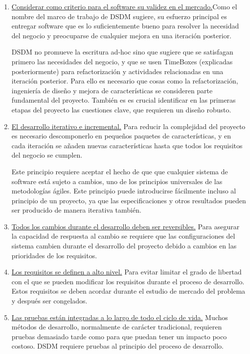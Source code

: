 \documentclass[12pt,a4paper]{article}
\begin{document}
\begin{enumerate}
\item \underline{Considerar como criterio para el software su validez en el mercado.}Como el nombre del marco de trabajo de DSDM sugiere, su esfuerzo principal es entregar
software que es lo suficientemente bueno para resolver la necesidad del negocio y preocuparse de cualquier mejora en una iteración posterior.


 DSDM no promueve la escritura ad-hoc sino que sugiere que se satisfagan  primero las necesidades del negocio, y que se usen TimeBoxes (explicadas posteriormente) para
refactorización y actividades relacionadas en una iteración posterior. Para ello es necesario que cosas como  la refactorización, ingeniería de diseño y mejora de características se consideren parte fundamental del proyecto. También es es crucial identificar en las primeras etapas del proyecto las cuestiones clave, que requieren un diseño robusto.




\item \underline{El desarrollo iterativo e incremental.}
Para reducir la complejidad del proyecto es necesario descomponerlo en pequeños paquetes de  características, y en cada iteración se añaden nuevas características hasta que todos los requisitos del negocio se cumplen.

 Este principio requiere aceptar el hecho de que que cualquier sistema de software está sujeto a cambios, uno de los principios universales de las metodologías ágiles. Este principio puede introducirse fácilmente incluso al principio de un proyecto, ya que las especificaciones y otros resultados pueden ser producido de manera iterativa también.


\item  \underline{Todos los cambios durante el desarrollo deben ser reversibles.} Para asegurar la capacidad de respuesta al cambio se requiere que las configuraciones del sistema cambien durante el desarrollo del proyecto debido a cambios en las prioridades de los requisitos.



\item \underline{Los requisitos se definen a alto nivel.} Para evitar limitar el grado de libertad con el que se pueden modificar los requisitos durante el proceso de desarrollo.  Estos requisitos se deben acordar durante el estudio de mercado del problema y después ser congelados.

\item  \underline{Las pruebas están integradas a lo largo de todo el ciclo de vida.} Muchos métodos de desarrollo, normalmente de carácter tradicional, requieren pruebas demasiado tarde como para que puedan tener un impacto poco costoso. DSDM requiere pruebas al principio del proceso de desarrollo.



\end{enumerate}
\end{document}
